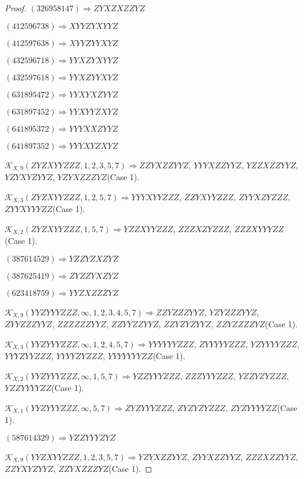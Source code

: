 \documentclass[12pt]{article}
\theoremstyle{plain}
\theoremstyle{definition}
\theoremstyle{remark}
\newcommand{\fancy}[1]{\mathcal{#1}}
\def\K{\fancy{K}}
\begin{document}
\begin{proof}
	$(3 2 6 9 5 8 1 4 7)\Rightarrow ZYXZXZZYZ$
	
	$(4 1 2 5 9 6 7 3 8)\Rightarrow XYYZYXYYZ$
	
	$(4 1 2 5 9 7 6 3 8)\Rightarrow XYYZYYXYZ$
	
	$(4 3 2 5 9 6 7 1 8)\Rightarrow YYXZYXYYZ$
	
	$(4 3 2 5 9 7 6 1 8)\Rightarrow YYXZYYXYZ$
	
	$(6 3 1 8 9 5 4 7 2)\Rightarrow YYXYXZYYZ$
	
	$(6 3 1 8 9 7 4 5 2)\Rightarrow YYXYYZXYZ$
	
	$(6 4 1 8 9 5 3 7 2)\Rightarrow YYYXXZYYZ$
	
	$(6 4 1 8 9 7 3 5 2)\Rightarrow YYYXYZXYZ$
	
	
	
	$\K_{X,9}(ZYZXYYZZZ,1, 2, 3, 5, 7)\Rightarrow $$ZZYXZZYYZ$, $YYYXZZYYZ$, $YZZXZZYYZ$, $YZYXYZYYZ$, $YZYXZZZYZ$(Case 1).
	
	$\K_{X,3}(ZYZXYYZZZ,1, 2, 5, 7)\Rightarrow $$YYYXYYZZZ$, $ZZYXYYZZZ$, $ZYYXZYZZZ$, $ZYYXYYYZZ$(Case 1).
	
	$\K_{X,2}(ZYZXYYZZZ,1, 5, 7)\Rightarrow $$YZZXYYZZZ$, $ZZZXZYZZZ$, $ZZZXYYYZZ$(Case 1).
	
	
	
	$(3 8 7 6 1 4 5 2 9)\Rightarrow YZZYZXZYZ$
	
	$(3 8 7 6 2 5 4 1 9)\Rightarrow ZYZZYXZYZ$
	
	$(6 2 3 4 1 8 7 5 9)\Rightarrow YYZXZZZYZ$
	
	
	
	$\K_{X,9}(YYZYYYZZZ,\infty,1, 2, 3, 4, 5, 7)\Rightarrow $$ZZYZZZYYZ$, $YZYZZZYYZ$, $ZYYZZZYYZ$, $ZZZZZZYYZ$, $ZZYYZZYYZ$, $ZZYZYZYYZ$, $ZZYZZZZYZ$(Case 1).
	
	$\K_{X,3}(YYZYYYZZZ,\infty,1, 2, 4, 5, 7)\Rightarrow $$YYYYYYZZZ$, $ZYYYYYZZZ$, $YZYYYYZZZ$, $YYYZYYZZZ$, $YYYYZYZZZ$, $YYYYYYYZZ$(Case 1).
	
	$\K_{X,2}(YYZYYYZZZ,\infty,1, 5, 7)\Rightarrow $$YZZYYYZZZ$, $ZZZYYYZZZ$, $YZZYZYZZZ$, $YZZYYYYZZ$(Case 1).
	
	$\K_{X,1}(YYZYYYZZZ,\infty,5, 7)\Rightarrow $$ZYZYYYZZZ$, $ZYZYZYZZZ$, $ZYZYYYYZZ$(Case 1).
	
	
	
	$(5 8 7 6 1 4 3 2 9)\Rightarrow YZZYYYZYZ$
	
	
	
	$\K_{X,9}(YYZXYYZZZ,1, 2, 3, 5, 7)\Rightarrow $$YZYXZZYYZ$, $ZYYXZZYYZ$, $ZZZXZZYYZ$, $ZZYXYZYYZ$, $ZZYXZZZYZ$(Case 1).
	

\end{proof}
\end{document}
